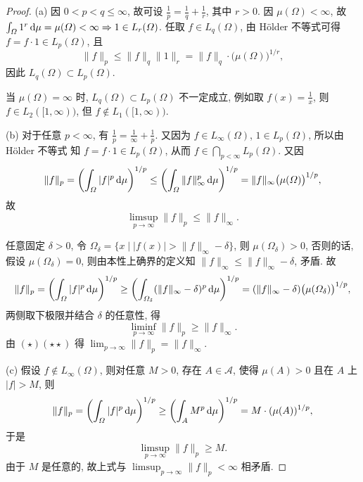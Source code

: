 \begin{proof}
    (a) 因 $0<p<q\leq\infty$, 故可设 $\frac{1}{p}=\frac{1}{q}+\frac{1}{r}$, 其中 $r>0$.
    因 $\mu(\varOmega)<\infty$, 故 $\int_{\varOmega}1^r\mathop{}\!\mathrm{d}\mu=\mu(\varOmega)<\infty\Rightarrow 1\in L_r(\varOmega)$.
    任取 $f\in L_q(\varOmega)$, 由 H\"older 不等式可得 $f=f\cdot 1\in L_p(\varOmega)$, 且
    \[\|f\|_p\leq\|f\|_q\|1\|_r=\|f\|_q\cdot\big(\mu(\varOmega)\big)^{1/r},\]
    因此 $L_q(\varOmega)\subset L_p(\varOmega)$.

    当 $\mu(\varOmega)=\infty$ 时, $L_q(\varOmega)\subset L_p(\varOmega)$
    不一定成立, 例如取 $f(x)=\frac{1}{x}$, 则 $f\in L_2([1,\infty))$,
    但 $f\notin L_1([1,\infty))$.

    (b) 对于任意 $p<\infty$, 有 $\frac{1}{p}=\frac{1}{\infty}+\frac{1}{p}$.
    又因为 $f\in L_{\infty}(\varOmega)$, $1\in L_p(\varOmega)$, 所以由 H\"older 不等式
    知 $f=f\cdot 1\in L_p(\varOmega)$, 从而 $f\in\bigcap\limits_{p<\infty}L_p(\varOmega)$.
    又因
    \[\|f\|_p=\biggl(\int_{\varOmega}|f|^p\mathop{}\!\mathrm{d}\mu\biggr)^{1/p}\leq\biggl(\int_{\varOmega}\|f\|_{\infty}^p\mathop{}\!\mathrm{d}\mu\biggr)^{1/p}=\|f\|_{\infty}\bigl(\mu(\varOmega)\bigr)^{1/p},\]
    故
    \begin{equation}
        \limsup_{p\to\infty}\|f\|_p\leq\|f\|_{\infty}.\tag{$\star$}
    \end{equation}

    任意固定 $\delta>0$, 令 $\varOmega_{\delta}=\{x\mid |f(x)|>\|f\|_{\infty}-\delta\}$,
    则 $\mu(\varOmega_{\delta})>0$, 否则的话, 假设 $\mu(\varOmega_{\delta})=0$,
    则由本性上确界的定义知 $\|f\|_{\infty}\leq\|f\|_{\infty}-\delta$, 矛盾. 故
    \[\|f\|_p=\biggl(\int_{\varOmega}|f|^p\mathop{}\!\mathrm{d}\mu\biggr)^{1/p}\geq\biggl(\int_{\varOmega_{\delta}}(\|f\|_{\infty}-\delta)^p\mathop{}\!\mathrm{d}\mu\biggr)^{1/p}=(\|f\|_{\infty}-\delta)\bigl(\mu(\varOmega_{\delta})\bigr)^{1/p},\]
    两侧取下极限并结合 $\delta$ 的任意性, 得
    \begin{equation}
        \liminf_{p\to\infty}\|f\|_p\geq\|f\|_{\infty}.\tag{$\star\star$}
    \end{equation}
    由 $(\star)(\star\star)$ 得 $\lim_{p\to\infty}\|f\|_p=\|f\|_{\infty}$.

    (c) 假设 $f\notin L_{\infty}(\varOmega)$, 则对任意 $M>0$,
    存在 $A\in\mathcal{A}$, 使得 $\mu(A)>0$ 且在 $A$ 上 $|f|>M$, 则
    \[\|f\|_p=\biggl(\int_{\varOmega}|f|^p\mathop{}\!\mathrm{d}\mu\biggr)^{1/p}\geq\biggl(\int_A M^p\mathop{}\!\mathrm{d}\mu\biggr)^{1/p}=M\cdot(\mu(A))^{1/p},\]
    于是
    \[\limsup_{p\to\infty}\|f\|_p\geq M.\]
    由于 $M$ 是任意的, 故上式与 $\limsup_{p\to\infty}\|f\|_p<\infty$ 相矛盾.
\end{proof}




